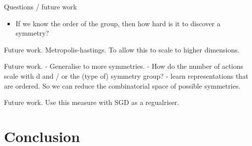 

Questions / future work
\begin{itemize}
	\item If we know the order of the group, then how hard is it to discover a symmetry?
\end{itemize}

Future work.
Metropolis-hastings. To allow this to scale to higher dimensions.


Future work.
- Generalise to more symmetries.
- How do the number of actions scale with d and / or the (type of) symmetry group?
- learn representations that are ordered. So we can reduce the combinatorial space of possible symmetries.

Future work.
Use this measure with SGD as a regualriser.




\section{Conclusion}

